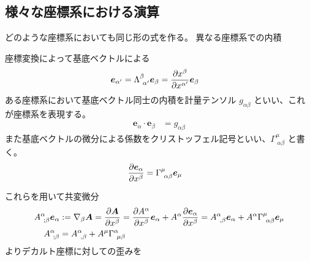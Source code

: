 \documentclass[uplatex,dvipdfmx,a4paper,11pt]{jlreq}
\renewcommand{\AA}{\bm{A}}
\newcommand{\ee}{\bm{e}}
\theoremstyle{definition}
\begin{document}
\subsection{様々な座標系における演算}
どのような座標系においても同じ形の式を作る。
異なる座標系での内積
\begin{definition}[座標系の基底ベクトル]
  座標変換によって基底ベクトルによる
  \begin{align}
    \ee_{\alpha'} & = \Lambda_{\ \alpha'}^\beta\ee_\beta = \diffp{x^\beta}{x^{\alpha'}}\ee_\beta
  \end{align}
  ある座標系において基底ベクトル同士の内積を計量テンソル $g_{\alpha\beta}$ といい、これが座標系を表現する。
  \begin{align}
    \ee_\alpha\cdot\ee_\beta & = g_{\alpha\beta}
  \end{align}
  また基底ベクトルの微分による係数をクリストッフェル記号といい、$\Gamma^\mu_{\ \alpha\beta}$ と書く。
  \begin{align}
    \diffp{\ee_\alpha}{x^\beta} & = \Gamma^\mu_{\ \alpha\beta}\ee_\mu
  \end{align}
\end{definition}
これらを用いて共変微分
\begin{align}
  A^\alpha_{\ ;\beta}\ee_\alpha & := \nabla_\beta\AA = \diffp{\AA}{x^\beta} = \diffp{A^\alpha}{x^\beta}\ee_\alpha + A^\alpha\diffp{\ee_\alpha}{x^\beta} = A^\alpha_{\ ,\beta}\ee_\alpha + A^\alpha\Gamma^\mu_{\ \alpha\beta}\ee_\mu \\
  A^\alpha_{\ ;\beta}           & = A^\alpha_{\ ,\beta} + A^\mu\Gamma^\alpha_{\ \mu\beta}
\end{align}
よりデカルト座標に対しての歪みを
\end{document}
